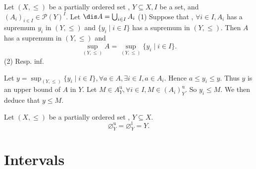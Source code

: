 \begin{propositionenv}
    Let $(X, \le)$ be a partially ordered set , $Y\subseteq X, I$ be a set,  and $(A_i)_{i\in I}\in \mathscr{P} (Y)^I$. Let $\dis A=\bigcup _{i\in I}A_i$
    \newline
    (1) Suppose that , $\forall i \in I, A_i$ has a supremum $y_i$ in $(Y, \le)$ and $\{y_i\mid i\in I\}$ has a supremum in $(Y, \le)$. Then $A$ has a supremum in $(Y, \le )$ and $$\sup_{(Y, \le)}A=\sup_{(Y, \le)}\{y_i\mid i\in I\}.$$
    \newline
    (2) Resp. inf.
\end{propositionenv}
\begin{proofenv}
    Let $y=\sup_{(Y, \le)}\{y_i\mid i\in I\}, \forall a\in A , \exists i\in I, a\in A_i$. Hence $a\le y_i\le y$. Thus $y $ is an upper bound of $A$ in $Y$. Let $M\in A_Y^\mathrm{u}, \forall i \in I, M\in (A_i)_Y^\mathrm{u}$.  So $y_i \le M $. We then deduce that $y\le M$.
\end{proofenv}
\begin{propositionenv}
    Let $(X, \le)$ be a partially ordered set , $Y\subseteq X$.$$\varnothing_Y^\mathrm{u}=\varnothing_Y^\mathrm{l}=Y.$$
\end{propositionenv}


\section{Intervals}

